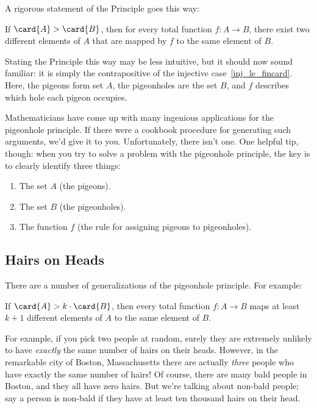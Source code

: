 A rigorous statement of the Principle goes this way:
\begin{rul}
  If $\card{A} > \card{B}$, then for every total function $f : A \to
  B$, there exist two different elements of $A$ that are mapped by $f$
  to the same element of $B$.
\end{rul}
Stating the Principle this way may be less intuitive, but it should
now sound familiar: it is simply the contrapositive of the
 injective case~\eqref{inj_le_fincard}.  Here, the
pigeons form set $A$, the pigeonholes are the set $B$, and $f$
describes which hole each pigeon occupies.

Mathematicians have come up with many ingenious applications for the
pigeonhole principle.  If there were a cookbook procedure for
generating such arguments, we'd give it to you.  Unfortunately, there
isn't one.  One helpful tip, though: when you try to solve a problem
with the pigeonhole principle, the key is to clearly identify three
things:

\begin{enumerate}

\item The set $A$ (the pigeons).

\item The set $B$ (the pigeonholes).

\item The function $f$ (the rule for assigning pigeons to pigeonholes).

\end{enumerate}


\subsection{Hairs on Heads}

There are a number of generalizations of the pigeonhole principle.
For example:
\begin{rul}
  If $\card{A} > k \cdot \card{B}$, then every total function $f : A \to
  B$ maps at least $k+1$ different elements of $A$ to the same element of
  $B$.
\end{rul}

For example, if you pick two people at random, surely they are extremely
unlikely to have \emph{exactly} the same number of hairs on their heads.
However, in the remarkable city of Boston, Massachusetts there are
actually \emph{three} people who have exactly the same number of hairs!
Of course, there are many bald people in Boston, and they all have zero
hairs.  But we're talking about non-bald people; say a person is non-bald
if they have at least ten thousand hairs on their head.


